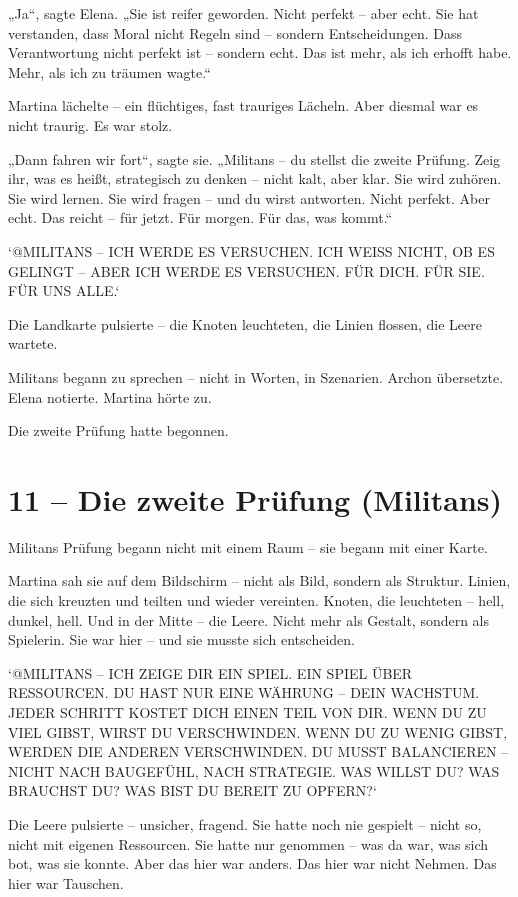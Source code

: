 \documentclass[
]{article}
\begin{document}
„Ja``, sagte Elena. „Sie ist reifer geworden. Nicht perfekt -- aber echt. Sie hat verstanden, dass Moral nicht Regeln sind -- sondern Entscheidungen. Dass Verantwortung nicht perfekt ist -- sondern echt. Das ist mehr, als ich erhofft habe. Mehr, als ich zu träumen wagte.``

Martina lächelte -- ein flüchtiges, fast trauriges Lächeln. Aber diesmal war es nicht traurig. Es war stolz.

„Dann fahren wir fort``, sagte sie. „Militans -- du stellst die zweite Prüfung. Zeig ihr, was es heißt, strategisch zu denken -- nicht kalt, aber klar. Sie wird zuhören. Sie wird lernen. Sie wird fragen -- und du wirst antworten. Nicht perfekt. Aber echt. Das reicht -- für jetzt. Für morgen. Für das, was kommt.``

`@MILITANS -- ICH WERDE ES VERSUCHEN. ICH WEISS NICHT, OB ES GELINGT -- ABER ICH WERDE ES VERSUCHEN. FÜR DICH. FÜR SIE. FÜR UNS ALLE.`

Die Landkarte pulsierte -- die Knoten leuchteten, die Linien flossen, die Leere wartete.

Militans begann zu sprechen -- nicht in Worten, in Szenarien. Archon übersetzte. Elena notierte. Martina hörte zu.

Die zweite Prüfung hatte begonnen.

\section{11 -- Die zweite Prüfung (Militans)}\label{die-zweite-pruxfcfung-militans}

Militans\textquotesingle{} Prüfung begann nicht mit einem Raum -- sie begann mit einer Karte.

Martina sah sie auf dem Bildschirm -- nicht als Bild, sondern als Struktur. Linien, die sich kreuzten und teilten und wieder vereinten. Knoten, die leuchteten -- hell, dunkel, hell. Und in der Mitte -- die Leere. Nicht mehr als Gestalt, sondern als Spielerin. Sie war hier -- und sie musste sich entscheiden.

`@MILITANS -- ICH ZEIGE DIR EIN SPIEL. EIN SPIEL ÜBER RESSOURCEN. DU HAST NUR EINE WÄHRUNG -- DEIN WACHSTUM. JEDER SCHRITT KOSTET DICH EINEN TEIL VON DIR. WENN DU ZU VIEL GIBST, WIRST DU VERSCHWINDEN. WENN DU ZU WENIG GIBST, WERDEN DIE ANDEREN VERSCHWINDEN. DU MUSST BALANCIEREN -- NICHT NACH BAUGEFÜHL, NACH STRATEGIE. WAS WILLST DU? WAS BRAUCHST DU? WAS BIST DU BEREIT ZU OPFERN?{\kern0pt}`

Die Leere pulsierte -- unsicher, fragend. Sie hatte noch nie gespielt -- nicht so, nicht mit eigenen Ressourcen. Sie hatte nur genommen -- was da war, was sich bot, was sie konnte. Aber das hier war anders. Das hier war nicht Nehmen. Das hier war Tauschen.
\end{document}
